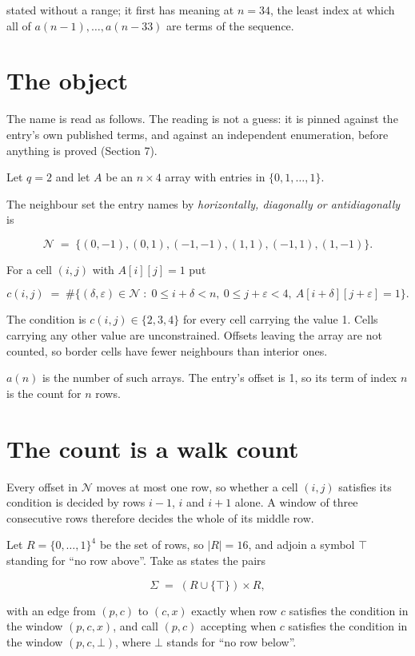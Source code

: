 \documentclass[11pt]{article}
\theoremstyle{definition}
\begin{document}
stated without a range; it first has meaning at $n = 34$, the least index at which all of $a(n-1),\dots,a(n-33)$ are terms of the sequence.

\section{The object}

The name is read as follows. The reading is not a guess: it is pinned against the entry's own published terms, and against an independent enumeration, before anything is proved (Section 7).

Let $q = 2$ and let $A$ be an $n \times 4$ array with entries in $\{0,1,\dots,1\}$.

The neighbour set the entry names by {\itshape horizontally, diagonally or antidiagonally} is

\[\mathcal{N} \;=\; \{(0,-1), (0,1), (-1,-1), (1,1), (-1,1), (1,-1)\}.\]

For a cell $(i,j)$ with $A[i][j] = 1$ put

\[c(i,j) \;=\; \#\bigl\{(\delta,\varepsilon)\in\mathcal{N} \;:\; 0\le i+\delta<n,\ 0\le j+\varepsilon<4,\ A[i+\delta][j+\varepsilon] = 1\bigr\}.\]

The condition is $c(i,j) \in \{2, 3, 4\}$ for every cell carrying the value 1. Cells carrying any other value are unconstrained. Offsets leaving the array are not counted, so border cells have fewer neighbours than interior ones.

$a(n)$ is the number of such arrays. The entry's offset is 1, so its term of index $n$ is the count for $n$ rows.

\section{The count is a walk count}

Every offset in $\mathcal{N}$ moves at most one row, so whether a cell $(i,j)$ satisfies its condition is decided by rows $i-1$, $i$ and $i+1$ alone. A window of three consecutive rows therefore decides the whole of its middle row.

Let $R = \{0,\dots,1\}^{4}$ be the set of rows, so $|R| = 16$, and adjoin a symbol $\top$ standing for ``no row above''. Take as states the pairs

\[\Sigma \;=\; (R \cup \{\top\}) \times R,\]

with an edge from $(p,c)$ to $(c,x)$ exactly when row $c$ satisfies the condition in the window $(p,c,x)$, and call $(p,c)$ accepting when $c$ satisfies the condition in the window $(p,c,\bot)$, where $\bot$ stands for ``no row below''.
\end{document}
